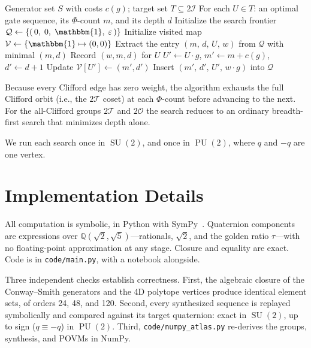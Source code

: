 \documentclass[11pt, oneside, openany]{scrbook}
\DeclareMathOperator{\SU}{SU}
\DeclareMathOperator{\PU}{PU}
\newcommand{\Id}{\mathbbm{1}}
\newcommand{\Tgroup}{\mathcal{T}}  %
\newcommand{\Ogroup}{\mathcal{O}}  %
\newcommand{\Igroup}{\mathcal{I}}  %
\newcommand{\TwoT}{2\Tgroup}
\newcommand{\TwoO}{2\Ogroup}
\newcommand{\TwoI}{2\Igroup}
\newcommand{\phig}{\tau} %
\begin{document}
\begin{algorithm}[H] %
\caption{$\Phi$-aware synthesis via Dijkstra's algorithm}
\label{alg:dijkstra_gen}
\begin{algorithmic}[1]
\Require Generator set $S$ with costs $c(g)$; target set $T \subseteq \TwoI$
\Ensure For each $U \in T$: an optimal gate sequence, its $\Phi$-count $m$, and its depth $d$
\State Initialize the search frontier $\mathcal{Q} \gets \{(\,0,\; 0,\; \Id,\; \varepsilon\,)\}$
\State Initialize visited map $\mathcal{V} \gets \{\Id \mapsto (0, 0)\}$
    \State Extract the entry $(m,\, d,\, U,\, w)$ from $\mathcal{Q}$ with minimal $(m, d)$
        \State Record $(w, m, d)$ for $U$ 
    \EndIf
        \State $U' \gets U \cdot g$, \quad $m' \gets m + c(g)$, \quad $d' \gets d + 1$
            \State Update $\mathcal{V}[U'] \gets (m', d')$
            \State Insert $(m',\, d',\, U',\, w \cdot g)$ into $\mathcal{Q}$
        \EndIf
    \EndFor
\EndWhile
\end{algorithmic}
\end{algorithm}

Because every Clifford edge has zero weight, the algorithm exhausts the full Clifford orbit (i.e., the $\TwoT$ coset) at each $\Phi$-count before advancing to the next. For the all-Clifford groups $\TwoT$ and $\TwoO$ the search reduces to an ordinary breadth-first search that minimizes depth alone.

We run each search once in $\SU(2)$, and once in $\PU(2)$, where $q$ and $-q$ are one vertex.

\section{Implementation Details} \label{sec:implementationdetails}

All computation is symbolic, in Python with SymPy~\cite{meurer2017sympysymboliccomputing}. Quaternion components are expressions over $\mathbb{Q}(\sqrt{2}, \sqrt{5})$---rationals, $\sqrt{2}$, and the golden ratio $\phig$---with no floating-point approximation at any stage. Closure and equality are exact. Code is in \texttt{code/main.py}, with a notebook alongside. %

Three independent checks establish correctness. First, the algebraic closure of the Conway--Smith generators and the 4D polytope vertices produce identical element sets, of orders 24, 48, and 120. Second, every synthesized sequence is replayed symbolically and compared against its target quaternion: exact in $\SU(2)$, up to sign ($q \equiv -q$) in $\PU(2)$. Third, \texttt{code/numpy\_atlas.py} re-derives the groups, synthesis, and POVMs in NumPy.
\end{document}
